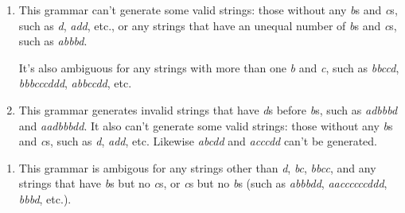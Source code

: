 \documentclass[11pt,fleqn]{article}
\begin{document}
\begin{enumerate}
          \begin{multicols}{2}

            \begin{enumerate}

              \addtolength{\itemsep}{0mm}

              \item This grammar can't generate some valid strings: those
                    without any \emph{b}s and \emph{c}s, such as \emph{d},
                    \emph{add}, etc., or any strings that have an unequal
                    number of \emph{b}s and \emph{c}s, such as \emph{abbbd}.

                    It's also ambiguous for any strings with more than one
                    \emph{b} and \emph{c}, such as \emph{bbccd},
                    \emph{bbbcccddd}, \emph{abbccdd}, etc.

                    \columnbreak

              \item This grammar generates invalid strings that have
                    \emph{d}s before \emph{b}s, such as \emph{adbbbd} and
                    \emph{aadbbbdd}. It also can't generate some valid
                    strings: those without any \emph{b}s and \emph{c}s,
                    such as \emph{d}, \emph{add}, etc.  Likewise
                    \emph{abcdd} and \emph{acccdd} can't be generated.

            \end{enumerate}

            \vspace{-2.5mm}

          \end{multicols}

          \medskip

          \begin{multicols}{2}

            \vspace{-2.5mm}

            \begin{enumerate}

              \addtolength{\itemsep}{0mm}

              \setcounter{enumii}{2}

              \item This grammar is ambigous for any strings other than
                    \emph{d}, \emph{bc}, \emph{bbcc}, and any strings that
                    have \emph{b}s but no \emph{c}s, or \emph{c}s but no
                    \emph{b}s (such as \emph{abbbdd}, \emph{aaccccccddd},
                    \emph{bbbd}, etc.).


\end{enumerate}
\end{multicols}
\end{enumerate}
\end{document}
